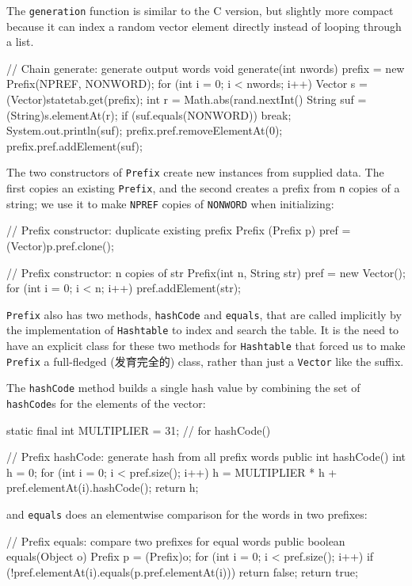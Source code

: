 The \verb'generation' function is similar to the C version, but slightly
more compact because it can index a random vector element directly instead
of looping through a list.
\begin{wellcode}
    // Chain generate: generate output words
    void generate(int nwords)
    {
        prefix = new Prefix(NPREF, NONWORD);
        for (int i = 0; i < nwords; i++) {
            Vector s = (Vector)statetab.get(prefix);
            int r = Math.abs(rand.nextInt() %
            String suf = (String)s.elementAt(r);
            if (suf.equals(NONWORD))
                break;
            System.out.println(suf);
            prefix.pref.removeElementAt(0);
            prefix.pref.addElement(suf);
        }
    }
\end{wellcode}

The two constructors of \verb'Prefix' create new instances from supplied
data. The first copies an existing \verb'Prefix', and the second creates a
prefix from \verb'n' copies of a string; we use it to make \verb'NPREF'
copies of \verb'NONWORD' when initializing:
\begin{wellcode}
    // Prefix constructor: duplicate existing prefix
    Prefix (Prefix p)
    {
        pref = (Vector)p.pref.clone();
    }

    // Prefix constructor: n copies of str
    Prefix(int n, String str)
    {
        pref = new Vector();
        for (int i = 0; i < n; i++)
            pref.addElement(str);
    }
\end{wellcode}

\verb'Prefix' also has two methods, \verb'hashCode' and \verb'equals', that
are called implicitly by the implementation of \verb'Hashtable' to index
and search the table. It is the need to have an explicit class for these
two methods for \verb'Hashtable' that forced us to make \verb'Prefix' a
full-fledged (发育完全的) class, rather than just a \verb'Vector' like the
suffix.

The \verb'hashCode' method builds a single hash value by combining the set
of \verb'hashCode's for the elements of the vector:
\begin{wellcode}
    static final int MULTIPLIER = 31;   // for hashCode()

    // Prefix hashCode: generate hash from all prefix words
    public int hashCode()
    {
        int h = 0;
        for (int i = 0; i < pref.size(); i++)
            h = MULTIPLIER * h + pref.elementAt(i).hashCode();
        return h;
    }
\end{wellcode}
and \verb'equals' does an elementwise comparison for the words in two
prefixes:
\begin{wellcode}
    // Prefix equals: compare two prefixes for equal words
    public boolean equals(Object o)
    {
        Prefix p = (Prefix)o;
        for (int i = 0; i < pref.size(); i++)
            if (!pref.elementAt(i).equals(p.pref.elementAt(i)))
                return false;
        return true;
    }
\end{wellcode}

